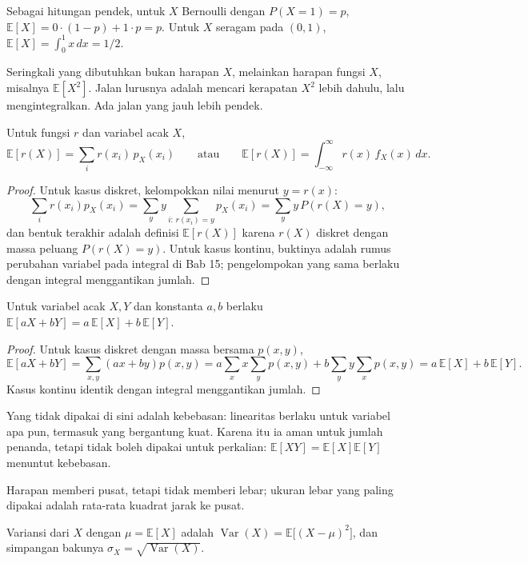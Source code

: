 Sebagai hitungan pendek, untuk $X$ Bernoulli dengan $P(X=1)=p$,
$\mathbb{E}[X]=0\cdot(1-p)+1\cdot p=p$. Untuk $X$ seragam pada $(0,1)$,
$\mathbb{E}[X]=\int_0^1x\,dx=1/2$.

Seringkali yang dibutuhkan bukan harapan $X$, melainkan harapan fungsi $X$, misalnya
$\mathbb{E}[X^2]$. Jalan lurusnya adalah mencari kerapatan $X^2$ lebih dahulu, lalu
mengintegralkan. Ada jalan yang jauh lebih pendek.

\begin{teorema}
Untuk fungsi $r$ dan variabel acak $X$,
\[
\mathbb{E}[r(X)]=\sum_i r(x_i)\,p_X(x_i)
\qquad\text{atau}\qquad
\mathbb{E}[r(X)]=\int_{-\infty}^{\infty}r(x)\,f_X(x)\,dx .
\]
\end{teorema}

\begin{proof}
Untuk kasus diskret, kelompokkan nilai menurut $y=r(x)$:
\[
\sum_i r(x_i)p_X(x_i)=\sum_y y\sum_{i:\,r(x_i)=y}p_X(x_i)=\sum_y y\,P(r(X)=y),
\]
dan bentuk terakhir adalah definisi $\mathbb{E}[r(X)]$ karena $r(X)$ diskret dengan
massa peluang $P(r(X)=y)$. Untuk kasus kontinu, buktinya adalah rumus perubahan
variabel pada integral di Bab 15; pengelompokan yang sama berlaku dengan integral
menggantikan jumlah.
\end{proof}

\begin{proposisi}
Untuk variabel acak $X,Y$ dan konstanta $a,b$ berlaku
$\mathbb{E}[aX+bY]=a\,\mathbb{E}[X]+b\,\mathbb{E}[Y]$.
\end{proposisi}

\begin{proof}
Untuk kasus diskret dengan massa bersama $p(x,y)$,
\[
\mathbb{E}[aX+bY]=\sum_{x,y}(ax+by)p(x,y)
=a\sum_x x\sum_y p(x,y)+b\sum_y y\sum_x p(x,y)=a\,\mathbb{E}[X]+b\,\mathbb{E}[Y].
\]
Kasus kontinu identik dengan integral menggantikan jumlah.
\end{proof}

Yang tidak dipakai di sini adalah kebebasan: linearitas berlaku untuk variabel apa pun,
termasuk yang bergantung kuat. Karena itu ia aman untuk jumlah penanda, tetapi tidak
boleh dipakai untuk perkalian: $\mathbb{E}[XY]=\mathbb{E}[X]\mathbb{E}[Y]$ menuntut
kebebasan.

Harapan memberi pusat, tetapi tidak memberi lebar; ukuran lebar yang paling dipakai
adalah rata-rata kuadrat jarak ke pusat.

\begin{definisi}[Variansi]
Variansi dari $X$ dengan $\mu=\mathbb{E}[X]$ adalah
$\operatorname{Var}(X)=\mathbb{E}\bigl[(X-\mu)^2\bigr]$, dan simpangan bakunya
$\sigma_X=\sqrt{\operatorname{Var}(X)}$.
\end{definisi}

